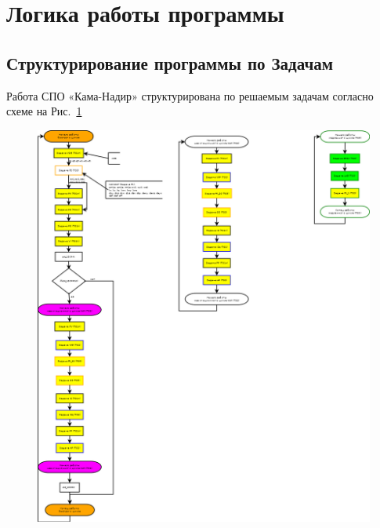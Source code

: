 \section{Логика работы программы} \label{logic}
\subsection{Структурирование программы по Задачам}
Работа СПО «Кама-Надир» структурирована по решаемым задачам согласно  схеме на Рис.~\ref{fig:general_scheme}
\begin{figure}[H]
    \centering
    \includegraphics{images/general_scheme.png}
    \label{fig:general_scheme}
\end{figure}
